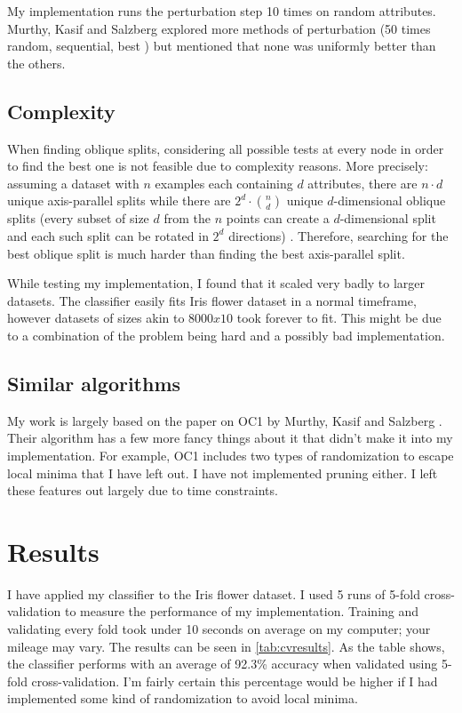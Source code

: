 \documentclass[12pt]{article}
\begin{document}
My implementation runs the perturbation step 10 times on random attributes. Murthy, Kasif and Salzberg explored more methods of perturbation (50 times random, sequential, best \cite{KSM:1994}) but mentioned that none was uniformly better than the others.

\subsection{Complexity}
When finding oblique splits, considering all possible tests at every node in order to find the best one is not feasible due to complexity reasons. More precisely: assuming a dataset with $n$ examples each containing $d$ attributes, there are $n \cdot d$ unique axis-parallel splits while there are $2^d \cdot {n \choose d}$ unique $d$-dimensional oblique splits (every subset of size $d$ from the $n$ points can create a $d$-dimensional split and each such split can be rotated in $2^d$ directions) \cite{KSM:1994}. Therefore, searching for the best oblique split is much harder than finding the best axis-parallel split.

While testing my implementation, I found that it scaled very badly to larger datasets. The classifier easily fits Iris flower dataset in a normal timeframe, however datasets of sizes akin to $8000x10$ took forever to fit. This might be due to a combination of the problem being hard and a possibly bad implementation.

\subsection{Similar algorithms}
My work is largely based on the paper on OC1 by Murthy, Kasif and Salzberg \cite{KSM:1994}. Their algorithm has a few more fancy things about it that didn't make it into my implementation. For example, OC1 includes two types of randomization to escape local minima that I have left out. I have not implemented pruning either. I left these features out largely due to time constraints.

\section{Results}
I have applied my classifier to the Iris flower dataset. I used 5 runs of 5-fold cross-validation to measure the performance of my implementation. Training and validating every fold took under 10 seconds on average on my computer; your mileage may vary. The results can be seen in \cref{tab:cvresults}. As the table shows, the classifier performs with an average of 92.3\% accuracy when validated using 5-fold cross-validation. I'm fairly certain this percentage would be higher if I had implemented some kind of randomization to avoid local minima.
\end{document}
